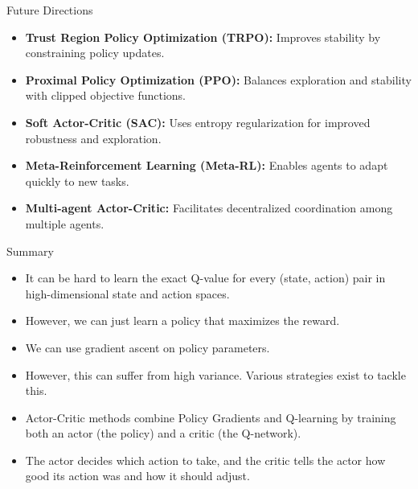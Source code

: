 \begin{frame}{Future Directions}
    \begin{itemize}
        \item \textbf{Trust Region Policy Optimization (TRPO):} Improves stability by constraining policy updates.
        \item \textbf{Proximal Policy Optimization (PPO):} Balances exploration and stability with clipped objective functions.
        \item \textbf{Soft Actor-Critic (SAC):} Uses entropy regularization for improved robustness and exploration.
        \item \textbf{Meta-Reinforcement Learning (Meta-RL):} Enables agents to adapt quickly to new tasks.
        \item \textbf{Multi-agent Actor-Critic:} Facilitates decentralized coordination among multiple agents.
    \end{itemize}
\end{frame}

\begin{frame}{Summary}
\begin{itemize}
    \item It can be hard to learn the exact Q-value for every (state, action) pair in high-dimensional state and action spaces.
    \item However, we can just learn a policy that maximizes the reward.
    \item We can use gradient ascent on policy parameters.
    \item However, this can suffer from high variance. Various strategies exist to tackle this.
    \item Actor-Critic methods combine Policy Gradients and Q-learning by training both an actor (the policy) and a critic (the Q-network).
    \item The actor decides which action to take, and the critic tells the actor how good its action was and how it should adjust.
\end{itemize}
\end{frame}